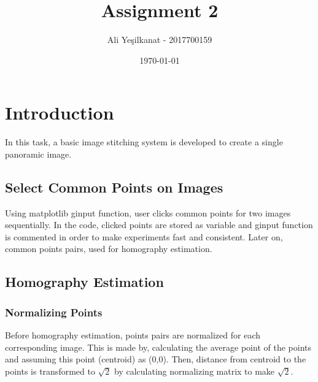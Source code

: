 \documentclass[letterpaper,12pt]{article}
\begin{document}
\title{Assignment 2}
\author{Ali Yeşilkanat - 2017700159}
\date{\today}
\maketitle



\section{Introduction}

In this task, a basic image stitching system is developed to create a single panoramic image. 

\subsection{Select Common Points on Images}
Using matplotlib ginput function, user clicks common points for two images sequentially. In the code, clicked points are stored as variable and ginput function is commented in order to make experiments fast and consistent. Later on, common points pairs, used for homography estimation.

\subsection{Homography Estimation}
\subsubsection{Normalizing Points} \label{sssec:normalizing points}
Before homography estimation, points pairs are normalized for each corresponding image.
This is made by, calculating the average point of the points and assuming this point (centroid) as (0,0). Then, distance from centroid to the points is transformed to $\sqrt{2}$ by calculating normalizing matrix to make $\sqrt{2}$.
\end{document}

